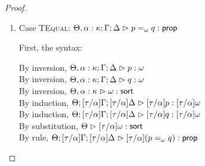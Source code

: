 \begin{proof}
\begin{enumerate}
  For semantics, consider
  $\interp{\judgeA[\Theta; {[\tau/\alpha]}\Gamma; {[\tau/\alpha]}\Delta]
                  {{[\tau/\alpha]}(Q \beta:\kappa'.\;p)}{\assert}}\;\theta\;\gamma\;\delta$ 
  \begin{eqnproof}
          {Semantics}
          {Induction}
          {Semantics}
  \end{eqnproof}

  The correctness of the application of $\gamma$ and $\delta$ follows from the equations for
  contexts under substitution. We also silently permute the context in the second line.

\item Case \textsc{TEqual}: $\judgeA[\Theta, \alpha:\kappa; \Gamma; \Delta]{p =_\omega q}{\assert}$
  
  First, the syntax:
  \begin{tabbedproof}
    \oo By inversion, $\judgeA[\Theta, \alpha:\kappa; \Gamma; \Delta]{p}{\omega}$ \\
    \oo By inversion, $\judgeA[\Theta, \alpha:\kappa; \Gamma; \Delta]{q}{\omega}$ \\
    \oo By inversion, $\judgeSort[\Theta, \alpha:\kappa]{\omega}$ \\
    \oo By induction, $\judgeA[\Theta; {[\tau/\alpha]}\Gamma; {[\tau/\alpha]}\Delta]{{[\tau/\alpha]}p}{{[\tau/\alpha]}\omega}$ \\
    \oo By induction, $\judgeA[\Theta; {[\tau/\alpha]}\Gamma; {[\tau/\alpha]}\Delta]{{[\tau/\alpha]}q}{{[\tau/\alpha]}\omega}$ \\
    \oo By substitution, $\judgeSort[\Theta]{{[\tau/\alpha]}\omega}$ \\
    \oo By rule, $\judgeA[\Theta; {[\tau/\alpha]}\Gamma; {[\tau/\alpha]}\Delta]{{[\tau/\alpha]}(p =_\omega q)}{\assert}$
  \end{tabbedproof}


\end{enumerate}
\end{proof}
